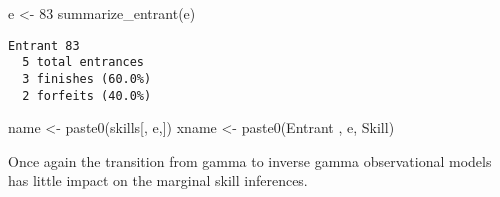 \documentclass[
  letterpaper,
  DIV=11,
  numbers=noendperiod]{scrartcl}
\newenvironment{Shaded}{\begin{snugshade}}{\end{snugshade}}
\newcommand{\DecValTok}[1]{\textcolor[rgb]{0.68,0.00,0.00}{#1}}
\newcommand{\FunctionTok}[1]{\textcolor[rgb]{0.28,0.35,0.67}{#1}}
\newcommand{\NormalTok}[1]{\textcolor[rgb]{0.00,0.23,0.31}{#1}}
\newcommand{\OtherTok}[1]{\textcolor[rgb]{0.00,0.23,0.31}{#1}}
\newcommand{\StringTok}[1]{\textcolor[rgb]{0.13,0.47,0.30}{#1}}
\begin{document}
\begin{Shaded}
\begin{Highlighting}[]
\NormalTok{e }\OtherTok{\textless{}{-}} \DecValTok{83}
\FunctionTok{summarize\_entrant}\NormalTok{(e)}
\end{Highlighting}
\end{Shaded}

\begin{verbatim}
Entrant 83
  5 total entrances
  3 finishes (60.0%)
  2 forfeits (40.0%)
\end{verbatim}

\begin{Shaded}
\begin{Highlighting}[]
\NormalTok{name }\OtherTok{\textless{}{-}} \FunctionTok{paste0}\NormalTok{(}\StringTok{\textquotesingle{}skills[\textquotesingle{}}\NormalTok{, e,}\StringTok{\textquotesingle{}]\textquotesingle{}}\NormalTok{)}
\NormalTok{xname }\OtherTok{\textless{}{-}} \FunctionTok{paste0}\NormalTok{(}\StringTok{\textquotesingle{}Entrant \textquotesingle{}}\NormalTok{, e, }\StringTok{\textquotesingle{} Skill\textquotesingle{}}\NormalTok{)}
\end{Highlighting}
\end{Shaded}

Once again the transition from gamma to inverse gamma observational
models has little impact on the marginal skill inferences.
\end{document}
